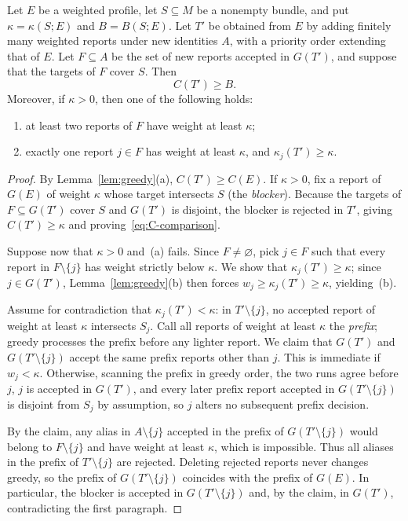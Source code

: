 \documentclass[format=acmsmall, review=false]{acmart}
\theoremstyle{acmdefinition}%
\begin{document}
\begin{lemma}
\label{lem:displacement}
Let \(E\) be a weighted profile, let \(S\subseteq M\) be a
nonempty bundle, and put \(\kappa=\kappa(S;E)\) and
\(B=B(S;E)\). Let \(T'\) be obtained from \(E\) by adding
finitely many weighted reports under new identities \(A\), with a
priority order extending that of \(E\). Let \(F\subseteq A\) be
the set of new reports accepted in \(G(T')\), and suppose that the
targets of \(F\) cover \(S\). Then
\begin{equation}\label{eq:C-comparison}
C(T')\ge B.
\end{equation}
Moreover, if \(\kappa>0\), then one of the following holds:
\begin{enumerate}
\item[(a)] at least two reports of \(F\) have weight at least
\(\kappa\);
\item[(b)] exactly one report \(j\in F\) has weight at least
\(\kappa\), and \(\kappa_j(T')\ge\kappa\).
\end{enumerate}
\end{lemma}

\begin{proof}
By Lemma~\ref{lem:greedy}(a), \(C(T')\ge C(E)\). If \(\kappa>0\),
fix a report of \(G(E)\) of weight \(\kappa\) whose target
intersects \(S\) (the \emph{blocker}). Because the targets of
\(F\subseteq G(T')\) cover \(S\) and \(G(T')\) is disjoint, the
blocker is rejected in \(T'\), giving \(C(T')\ge\kappa\) and
proving~\eqref{eq:C-comparison}.

Suppose now that \(\kappa>0\) and~(a) fails. Since \(F\ne\varnothing\),
pick \(j\in F\) such that every report in \(F\setminus\{j\}\) has
weight strictly below \(\kappa\). We show that
\(\kappa_j(T')\ge\kappa\); since \(j\in G(T')\),
Lemma~\ref{lem:greedy}(b) then forces \(w_j\ge\kappa_j(T')\ge\kappa\),
yielding~(b).

Assume for contradiction that \(\kappa_j(T')<\kappa\): in
\(T'\setminus\{j\}\), no accepted report of weight at least
\(\kappa\) intersects \(S_j\). Call all reports of weight at least
\(\kappa\) the \emph{prefix}; greedy processes the prefix before
any lighter report. We claim that \(G(T')\) and
\(G(T'\setminus\{j\})\) accept the same prefix reports other than
\(j\). This is immediate if \(w_j<\kappa\). Otherwise, scanning
the prefix in greedy order, the two runs agree before \(j\),
\(j\) is accepted in \(G(T')\), and every later prefix report
accepted in \(G(T'\setminus\{j\})\) is disjoint from \(S_j\) by
assumption, so \(j\) alters no subsequent prefix decision.

By the claim, any alias in \(A\setminus\{j\}\) accepted in the
prefix of \(G(T'\setminus\{j\})\) would belong to
\(F\setminus\{j\}\) and have weight at least \(\kappa\), which is
impossible. Thus all aliases in the prefix of
\(T'\setminus\{j\}\) are rejected. Deleting rejected reports never
changes greedy, so the prefix of \(G(T'\setminus\{j\})\) coincides
with the prefix of \(G(E)\). In particular, the blocker is
accepted in \(G(T'\setminus\{j\})\) and, by the claim, in
\(G(T')\), contradicting the first paragraph.
\end{proof}
\end{document}
